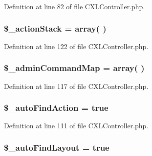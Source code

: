 Definition at line 82 of file CXLController.php.

\hypertarget{classCXLController_a1a4bf00b331c163adc5f346e51ecb51f}{
\subsubsection[{\$\_\-actionStack}]{\setlength{\rightskip}{0pt plus 5cm}\$\_\-actionStack = array( )}}
\label{classCXLController_a1a4bf00b331c163adc5f346e51ecb51f}


Definition at line 122 of file CXLController.php.

\hypertarget{classCXLController_aec275c56f2c1e8ffe8a5e454a2b695b5}{
\subsubsection[{\$\_\-adminCommandMap}]{\setlength{\rightskip}{0pt plus 5cm}\$\_\-adminCommandMap = array( )}}
\label{classCXLController_aec275c56f2c1e8ffe8a5e454a2b695b5}


Definition at line 117 of file CXLController.php.

\hypertarget{classCXLController_a6f28f5590fd179dd9b15a0647118661e}{
\subsubsection[{\$\_\-autoFindAction}]{\setlength{\rightskip}{0pt plus 5cm}\$\_\-autoFindAction = true}}
\label{classCXLController_a6f28f5590fd179dd9b15a0647118661e}


Definition at line 111 of file CXLController.php.

\hypertarget{classCXLController_ab2767a4ea7c0e2a4469056d506d354ba}{
\subsubsection[{\$\_\-autoFindLayout}]{\setlength{\rightskip}{0pt plus 5cm}\$\_\-autoFindLayout = true}}
\label{classCXLController_ab2767a4ea7c0e2a4469056d506d354ba}


